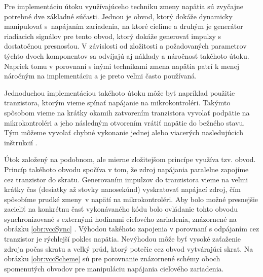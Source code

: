 Pre implementáciu útoku využívajúceho techniku zmeny napätia sú zvyčajne potrebné dve základné súčasti. Jednou je obvod, ktorý dokáže dynamicky manipulovať s~napájaním zariadenia, na ktoré cielime a druhým je generátor riadiacich signálov pre tento obvod, ktorý dokáže generovať impulzy s dostatočnou presnosťou. V závislosti od zložitosti a požadovaných parametrov týchto dvoch komponentov sa odvíjajú aj náklady a náročnosť takéhoto útoku. Napriek tomu v porovnaní s inými technikami zmena napätia patrí k menej náročným na implementáciu a je preto veľmi často používaná. 

Jednoduchou implementáciou takéhoto útoku môže byť napríklad použitie tranzistora, ktorým vieme spínať napájanie na mikrokontroléri. Takýmto spôsobom vieme na krátky okamih zatvorením tranzistora vyvolať podpätie na mikrokontroléri a jeho následným otvorením vrátiť napätie do bežného stavu. Tým môžeme vyvolať chybné vykonanie jednej alebo viacerých nasledujúcich inštrukcií \cite{vccOnTheCheap}.

Útok založený na podobnom, ale mierne zložitejšom princípe využíva tzv.  obvod. Princíp takéhoto obvodu spočíva v tom, že zdroj napájania paralelne zapojíme cez tranzistor do skratu. Generovaním impulzov do tranzistora vieme na veľmi krátky čas (desiatky až stovky nanosekúnd) vyskratovať napájací zdroj, čím spôsobíme prudké zmeny~v napätí na mikrokontroléri. Aby bolo možné presnejšie zacieliť na konkrétnu časť vykonávaného kódu bolo ovládanie tohto obvodu synchronizované s externými hodinami cieľového zariadenia, znázornené na obrázku \ref{obr:vccSync} \cite{crowbars}. Výhodou takéhoto zapojenia v porovnaní s odpájaním cez tranzistor je rýchlejší pokles napätia. Nevýhodou môže byť vysoké zaťaženie zdroja počas skratu a veľký prúd, ktorý potečie cez obvod vytvárajúci skrat. Na obrázku \ref{obr:vccScheme} sú pre porovnanie znázornené schémy oboch spomenutých obvodov pre manipuláciu napájania cieľového zariadenia.

